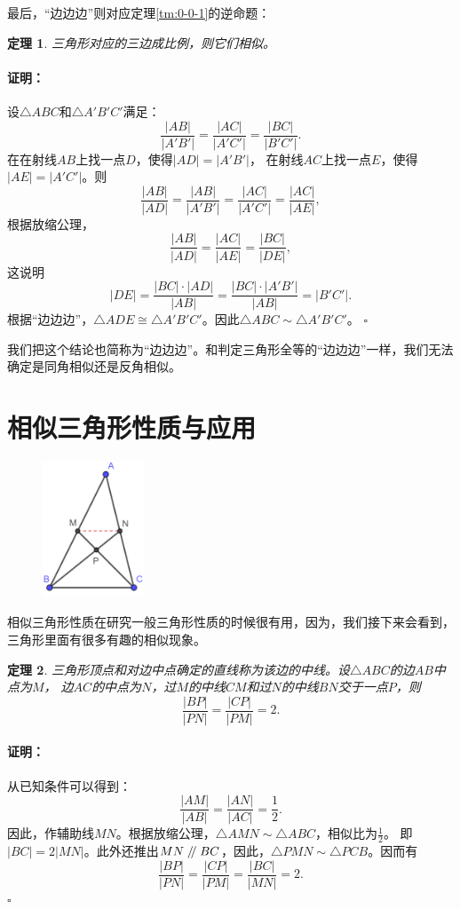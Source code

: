 \documentclass[12pt,UTF8]{ctexbook}
\newtheorem{tm}{定理}[section]
\newenvironment{proof2}{\paragraph{\textbf{证明：}}}{\hfill$\square$}
\renewcommand\parallel{\mathrel{/\mskip-4mu/}}
\begin{document}
最后，“边边边”则对应定理\ref{tm:0-0-1}的逆命题：
\begin{tm}\label{tm:0-1-1}
    三角形对应的三边成比例，则它们相似。
\end{tm}
\begin{proof2}
    设$\triangle ABC$和$\triangle A'B'C'$满足：
    $$ \frac{|AB|}{|A'B'|} = \frac{|AC|}{|A'C'|} = \frac{|BC|}{|B'C'|}.$$
    在在射线$AB$上找一点$D$，使得$|AD| = |A'B'|$，
    在射线$AC$上找一点$E$，使得$|AE| = |A'C'|$。则
    $$ \frac{|AB|}{|AD|} = \frac{|AB|}{|A'B'|} = \frac{|AC|}{|A'C'|} = \frac{|AC|}{|AE|},$$
    根据放缩公理，
    $$ \frac{|AB|}{|AD|} = \frac{|AC|}{|AE|} = \frac{|BC|}{|DE|},$$
    这说明
    $$ |DE| = \frac{|BC|\cdot |AD|}{|AB|} = \frac{|BC|\cdot |A'B'|}{|AB|} = |B'C'|. $$
    根据“边边边”，$\triangle ADE \cong \triangle A'B'C'$。因此$\triangle ABC \sim \triangle A'B'C'$。
\end{proof2}

我们把这个结论也简称为“边边边”。和判定三角形全等的“边边边”一样，我们无法确定是同角相似还是反角相似。

\section{相似三角形性质与应用}

\begin{figure} %
    \vspace{-10pt}
    \includegraphics[width=0.27\textwidth]{三角形8.png}
\end{figure}

相似三角形性质在研究一般三角形性质的时候很有用，因为，我们接下来会看到，三角形里面有很多有趣的相似现象。

\begin{tm}\label{tm:0-2-0}
    三角形顶点和对边中点确定的直线称为该边的中线。设$\triangle ABC$的边$AB$中点为$M$，
    边$AC$的中点为$N$，过$M$的中线$CM$和过$N$的中线$BN$交于一点$P$，则
    $$\frac{|BP|}{|PN|} = \frac{|CP|}{|PM|} = 2.$$
\end{tm}
\begin{proof2}
    从已知条件可以得到：
    $$\frac{|AM|}{|AB|} = \frac{|AN|}{|AC|} = \frac12.$$
    因此，作辅助线$MN$。根据放缩公理，$\triangle AMN \sim \triangle ABC$，相似比为$\frac12$。
    即$|BC| = 2|MN|$。此外还推出$MN \parallel BC$，因此，$\triangle PMN \sim \triangle PCB$。因而有
    $$\frac{|BP|}{|PN|} = \frac{|CP|}{|PM|} = \frac{|BC|}{|MN|} = 2.$$
\end{proof2}
\end{document}
